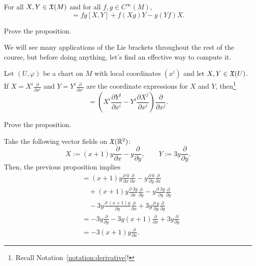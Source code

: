 \begin{proposition}
  For all $X, Y \in \mathfrak{X}(M)$ and for all $f,g\in C^\infty(M)$,
  \begin{equation}
    [fX, gY] = fg[X,Y] + f(Xg)Y - g(Yf)X.
  \end{equation}
\end{proposition}
\begin{exercise}
  Prove the proposition.
\end{exercise}

We will see many applications of the Lie brackets throughout the rest of the course, but before doing anything, let's find an effective way to compute it.

\begin{proposition}
    Let $(U, \varphi)$ be a chart on $M$ with local coordinates $(x^i)$ and let $X,Y\in\mathfrak{X}(U)$.
    If $X = X^i \frac{\partial }{\partial x^i}$ and $Y = Y^i \frac{\partial}{\partial x^i}$ are the coordinate expressions for $X$ and $Y$, then\footnote{Recall Notation~\ref{notation:derivative}!}
    \begin{equation}
        [X,Y] = \left(X^i\frac{\partial Y^j}{\partial x^i} - Y^i\frac{\partial X^j}{\partial x^i}\right)\frac{\partial}{\partial x^j}.
    \end{equation}
\end{proposition}
\begin{exercise}[\textit{[homework 2]}]
  Prove the proposition.
\end{exercise}

\begin{example}
  Take the following vector fields on $\mathfrak{X}(\mathbb{R}^2)$:
  \begin{equation}
    X := (x+1)y \frac{\partial}{\partial x} - y \frac{\partial}{\partial y},\qquad
    Y := 3y \frac{\partial}{\partial y}.
  \end{equation}
  Then, the previous proposition implies
  \begin{align}
    [X,Y] 
    &= (x+1)y  \frac{\partial\; 0}{\partial x} \frac{\partial}{\partial x} - y \frac{\partial\; 0}{\partial y} \frac{\partial}{\partial x} \\
    &\quad + (x+1)y  \frac{\partial\; 3y}{\partial x} \frac{\partial}{\partial y} - y \frac{\partial\; 3y}{\partial y} \frac{\partial}{\partial y} \\
    &\quad - 3y \frac{\partial\; (x+1)y}{\partial y} \frac{\partial}{\partial x} + 3y \frac{\partial\; y}{\partial y} \frac{\partial}{\partial y} \\
    &= - 3y \frac{\partial}{\partial y} -3 y(x+1) \frac{\partial}{\partial x} + 3y \frac{\partial}{\partial y} \\
    &= -3(x+1)y \frac{\partial}{\partial x}.
  \end{align}
\end{example}

